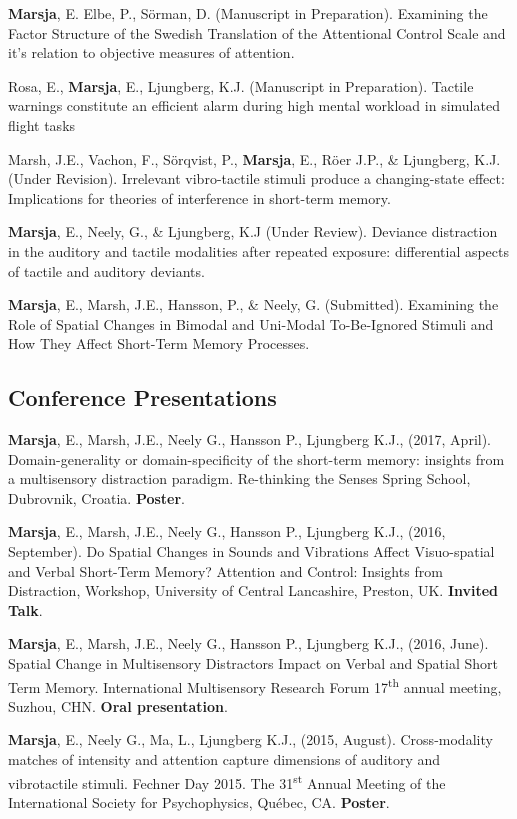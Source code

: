 \documentclass[]{article}
\begin{document}
\textbf{Marsja}, E. Elbe, P., Sörman, D. (Manuscript in Preparation).
Examining the Factor Structure of the Swedish Translation of the
Attentional Control Scale and it's relation to objective measures of
attention.

Rosa, E., \textbf{Marsja}, E., Ljungberg, K.J. (Manuscript in
Preparation). Tactile warnings constitute an efficient alarm during high
mental workload in simulated flight tasks

Marsh, J.E., Vachon, F., Sörqvist, P., \textbf{Marsja}, E., Röer J.P.,
\& Ljungberg, K.J. (Under Revision). Irrelevant vibro-tactile stimuli
produce a changing-state effect: Implications for theories of
interference in short-term memory.

\textbf{Marsja}, E., Neely, G., \& Ljungberg, K.J (Under Review).
Deviance distraction in the auditory and tactile modalities after
repeated exposure: differential aspects of tactile and auditory
deviants.

\textbf{Marsja}, E., Marsh, J.E., Hansson, P., \& Neely, G. (Submitted).
Examining the Role of Spatial Changes in Bimodal and Uni-Modal
To-Be-Ignored Stimuli and How They Affect Short-Term Memory Processes.

\subsection{Conference Presentations}\label{conference-presentations}

\textbf{Marsja}, E., Marsh, J.E., Neely G., Hansson P., Ljungberg K.J.,
(2017, April). Domain-generality or domain-specificity of the short-term
memory: insights from a multisensory distraction paradigm. Re-thinking
the Senses Spring School, Dubrovnik, Croatia. \textbf{Poster}.

\textbf{Marsja}, E., Marsh, J.E., Neely G., Hansson P., Ljungberg K.J.,
(2016, September). Do Spatial Changes in Sounds and Vibrations Affect
Visuo-spatial and Verbal Short-Term Memory? Attention and Control:
Insights from Distraction, Workshop, University of Central Lancashire,
Preston, UK. \textbf{Invited Talk}.

\textbf{Marsja}, E., Marsh, J.E., Neely G., Hansson P., Ljungberg K.J.,
(2016, June). Spatial Change in Multisensory Distractors Impact on
Verbal and Spatial Short Term Memory. International Multisensory
Research Forum 17\textsuperscript{th} annual meeting, Suzhou, CHN.
\textbf{Oral presentation}.

\textbf{Marsja}, E., Neely G., Ma, L., Ljungberg K.J., (2015, August).
Cross-modality matches of intensity and attention capture dimensions of
auditory and vibrotactile stimuli. Fechner Day 2015. The
31\textsuperscript{st} Annual Meeting of the International Society for
Psychophysics, Québec, CA. \textbf{Poster}.
\end{document}
